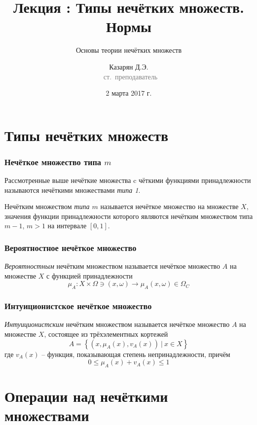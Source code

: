\documentclass{beamer}
\title{Лекция \textnumero 2: Типы нечётких множеств. Нормы}
\subtitle{Основы теории нечётких множеств}
\author{Казарян Д.Э.\\{\footnotesize\textcolor{gray}{~ст.~преподаватель}}}
\institute{РУДН, Инженерная академия\\Департамент механики и мехатроники}
\date{2 марта 2017 г.}
\begin{document}
\lstset{language=python}

\frame{\titlepage}

\section{Типы нечётких множеств}

\begin{frame}\frametitle{Нечёткое множество типа $m$}

    Рассмотренные выше нечёткие множества c чёткими функциями принадлежности называются нечёткими множествами \textit{типа 1}.
    
    \begin{definition}
        Нечётким множеством \textit{типа $m$} называется нечёткое множество на множестве $X$, значения функции принадлежности которого являются нечётким множеством типа $m-1$, $m > 1$ на интервале $[0, 1]$.
    \end{definition}
    
\end{frame}

\begin{frame}\frametitle{Вероятностное нечёткое множество}

    \begin{definition}
        \textit{Вероятностным} нечётким множеством называется нечёткое множество $A$ на множестве $X$ с функцией принадлежности
        \[
            \mu_A : X \times \Omega \ni (x, \omega) \to \mu_A(x, \omega) \in \Omega_C
        \]
    \end{definition}
    
\end{frame}

\begin{frame}\frametitle{Интуиционистское нечёткое множество}

    \begin{definition}
        \textit{Интуиционистским} нечётким множеством называется нечёткое множество $A$ на множестве $X$, состоящее из трёхэлементных кортежей
        \[
            A = \left\{ \left(x, \mu_A(x), v_A(x)\right)\ |\ x \in X \right\}
        \]
        где $v_A(x)$ -- функция, показывающая степень непринадлежности, причём
        \[
            0 \leq \mu_A(x) + v_A(x) \leq 1
        \]
    \end{definition}
    
\end{frame}

\section{Операции над нечёткими множествами}
\end{document}
